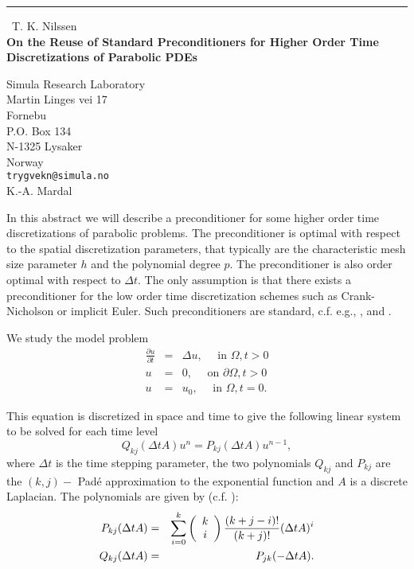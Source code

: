 \documentclass{report}
\begin{document}
\begin{center}
\rule{6in}{1pt} \
{\large T. K. Nilssen \\
{\bf On the Reuse of Standard Preconditioners for Higher Order Time Discretizations of Parabolic PDEs}}

Simula Research Laboratory \\ Martin Linges vei 17 \\ Fornebu \\ P.O. Box 134 \\ N-1325 Lysaker \\ Norway
\\
{\tt trygvekn@simula.no}\\
K.-A. Mardal\end{center}

\newtheorem{lemma}{Lemma}

In this abstract we will describe a preconditioner for some higher
order time discretizations of parabolic problems.
The preconditioner is optimal with respect to the spatial
discretization parameters, that typically are the characteristic mesh
size parameter $h$ and the polynomial degree $p$.
The preconditioner is also order optimal with respect to $\Delta t$.
The only assumption is that there exists a preconditioner for the low
order time
discretization schemes such as Crank-Nicholson or implicit Euler.
Such preconditioners are standard, c.f. e.g., \cite{BD},
\cite{olshanskii00convergence} and \cite{Thomee}.

We study the model problem
\begin{eqnarray*}
\frac{\partial u}{\partial t} &=& \Delta u, \quad \mbox{ in } \Omega, t > 0 \\
u &=& 0, \quad \mbox{ on } \partial \Omega, t>0 \\
u &=& u_0, \quad \mbox{ in } \Omega, t=0.
\end{eqnarray*}

This equation is discretized in space and time to give the
following linear system to be solved for each time level
\begin{equation*}
Q_{kj} (\Delta t A) u^n = P_{kj} (\Delta t A) u^{n-1},
\end{equation*}
where $\Delta t $ is the time stepping parameter, the two polynomials
$Q_{kj}$ and $P_{kj}$ are the $(k,j)-$ Pad\'{e} approximation to the
exponential function and $A$ is a discrete Laplacian.
The polynomials are given by (c.f. \cite{Thomee}):
\begin{eqnarray*}
P_{kj}(\Delta t A )&=&
\sum_{i=0}^k \left( \begin{array}{c c}
k \\
i
\end{array} \right) \frac {(k+j-i)!}{(k+j)!} (\Delta t A)^i \\
Q_{kj}(\Delta t A )&=&P_{jk}(-\Delta t A ).
\end{eqnarray*}
\end{document}
